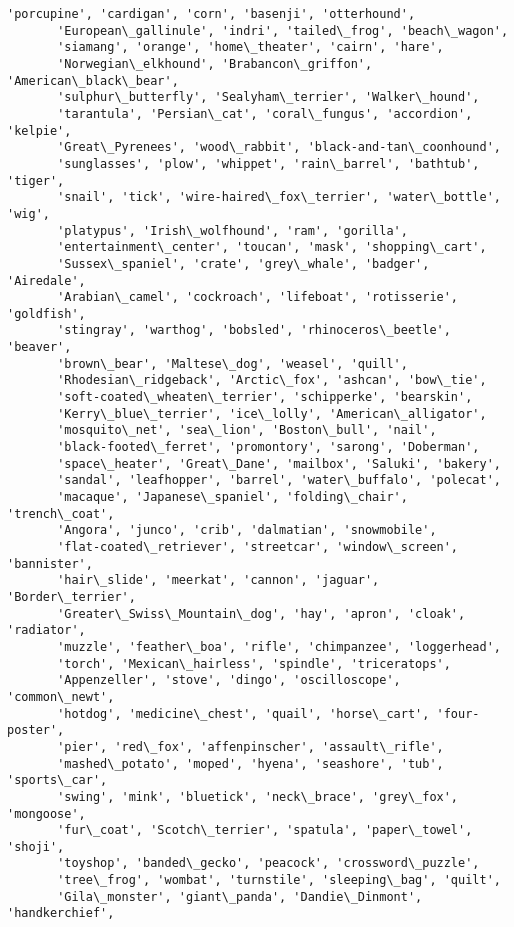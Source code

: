 \documentclass[11pt]{article}
\begin{document}
\begin{tcolorbox}[breakable, size=fbox, boxrule=.5pt, pad at break*=1mm, opacityfill=0]
\begin{Verbatim}[commandchars=\\\{\}]
       'porcupine', 'cardigan', 'corn', 'basenji', 'otterhound',
       'European\_gallinule', 'indri', 'tailed\_frog', 'beach\_wagon',
       'siamang', 'orange', 'home\_theater', 'cairn', 'hare',
       'Norwegian\_elkhound', 'Brabancon\_griffon', 'American\_black\_bear',
       'sulphur\_butterfly', 'Sealyham\_terrier', 'Walker\_hound',
       'tarantula', 'Persian\_cat', 'coral\_fungus', 'accordion', 'kelpie',
       'Great\_Pyrenees', 'wood\_rabbit', 'black-and-tan\_coonhound',
       'sunglasses', 'plow', 'whippet', 'rain\_barrel', 'bathtub', 'tiger',
       'snail', 'tick', 'wire-haired\_fox\_terrier', 'water\_bottle', 'wig',
       'platypus', 'Irish\_wolfhound', 'ram', 'gorilla',
       'entertainment\_center', 'toucan', 'mask', 'shopping\_cart',
       'Sussex\_spaniel', 'crate', 'grey\_whale', 'badger', 'Airedale',
       'Arabian\_camel', 'cockroach', 'lifeboat', 'rotisserie', 'goldfish',
       'stingray', 'warthog', 'bobsled', 'rhinoceros\_beetle', 'beaver',
       'brown\_bear', 'Maltese\_dog', 'weasel', 'quill',
       'Rhodesian\_ridgeback', 'Arctic\_fox', 'ashcan', 'bow\_tie',
       'soft-coated\_wheaten\_terrier', 'schipperke', 'bearskin',
       'Kerry\_blue\_terrier', 'ice\_lolly', 'American\_alligator',
       'mosquito\_net', 'sea\_lion', 'Boston\_bull', 'nail',
       'black-footed\_ferret', 'promontory', 'sarong', 'Doberman',
       'space\_heater', 'Great\_Dane', 'mailbox', 'Saluki', 'bakery',
       'sandal', 'leafhopper', 'barrel', 'water\_buffalo', 'polecat',
       'macaque', 'Japanese\_spaniel', 'folding\_chair', 'trench\_coat',
       'Angora', 'junco', 'crib', 'dalmatian', 'snowmobile',
       'flat-coated\_retriever', 'streetcar', 'window\_screen', 'bannister',
       'hair\_slide', 'meerkat', 'cannon', 'jaguar', 'Border\_terrier',
       'Greater\_Swiss\_Mountain\_dog', 'hay', 'apron', 'cloak', 'radiator',
       'muzzle', 'feather\_boa', 'rifle', 'chimpanzee', 'loggerhead',
       'torch', 'Mexican\_hairless', 'spindle', 'triceratops',
       'Appenzeller', 'stove', 'dingo', 'oscilloscope', 'common\_newt',
       'hotdog', 'medicine\_chest', 'quail', 'horse\_cart', 'four-poster',
       'pier', 'red\_fox', 'affenpinscher', 'assault\_rifle',
       'mashed\_potato', 'moped', 'hyena', 'seashore', 'tub', 'sports\_car',
       'swing', 'mink', 'bluetick', 'neck\_brace', 'grey\_fox', 'mongoose',
       'fur\_coat', 'Scotch\_terrier', 'spatula', 'paper\_towel', 'shoji',
       'toyshop', 'banded\_gecko', 'peacock', 'crossword\_puzzle',
       'tree\_frog', 'wombat', 'turnstile', 'sleeping\_bag', 'quilt',
       'Gila\_monster', 'giant\_panda', 'Dandie\_Dinmont', 'handkerchief',

\end{Verbatim}
\end{tcolorbox}
\end{document}
